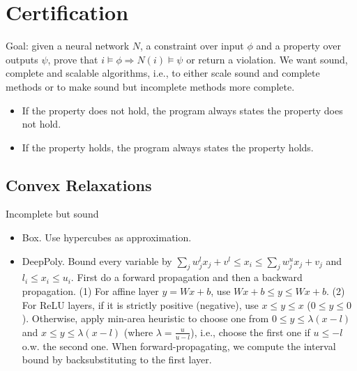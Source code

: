 \section{Certification}
Goal: given a neural network $N$, a constraint over input $\phi$ and a property over outputs $\psi$, prove that $i \vDash \phi \Rightarrow N(i) \vDash \psi$ or return a violation. We want sound, complete and scalable algorithms, i.e., to either scale sound and complete methods or to make sound but incomplete methods more complete.
\begin{itemize}
    \item If the property does not hold, the program always states the property does not hold.
    \item If the property holds, the program always states the property holds.
\end{itemize}

\subsection*{Convex Relaxations}
Incomplete but sound
\begin{itemize}
    \item Box. Use hypercubes as approximation.
    \item DeepPoly. Bound every variable by $\sum_j w^l_jx_j + v^l \leq x_i \leq \sum_j w^u_j x_j +v_j$ and $l_i \le x_i \le u_i$. First do a forward propagation and then a backward propagation. (1) For affine layer $y=Wx+b$, use $Wx+b\le y\le Wx+b$. (2) For ReLU layers, if it is strictly positive (negative), use $x\le y\le x$ ($0\le y\le 0$). Otherwise, apply min-area heuristic to choose one from $0\le y\le \lambda(x-l)$ and $x\le y \le \lambda(x-l)$ (where $\lambda=\frac{u}{u-l}$), i.e., choose the first one if $u\leq -l$ o.w. the second one. When forward-propagating, we compute the interval bound by backsubstituting to the first layer.
\end{itemize}

